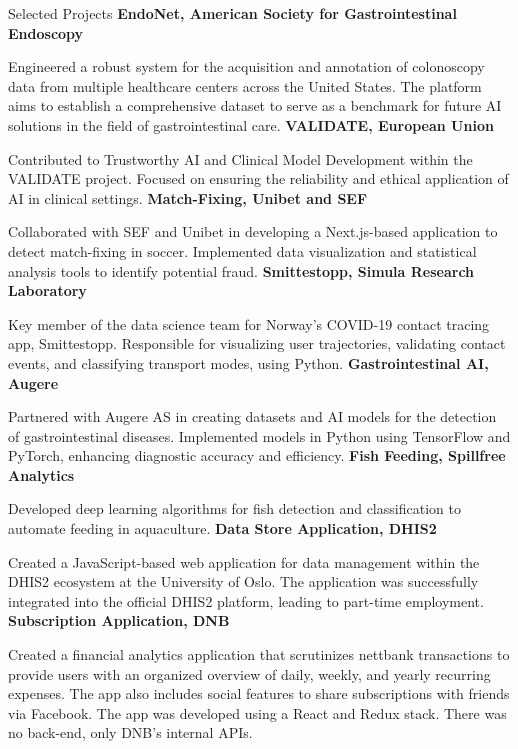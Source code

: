 \documentclass[a4paper,skipsamekey,10pt,english]{curve}
\begin{document}
\begin{rubric}{Selected Projects}
%
\entry*[2023]%
\textbf{EndoNet, American Society for Gastrointestinal Endoscopy} \par
Engineered a robust system for the acquisition and annotation of colonoscopy data from multiple healthcare centers across the United States. The platform aims to establish a comprehensive dataset to serve as a benchmark for future AI solutions in the field of gastrointestinal care.
%
\entry*[2023]%
\textbf{VALIDATE, European Union} \par 
Contributed to Trustworthy AI and Clinical Model Development within the VALIDATE project.
Focused on ensuring the reliability and ethical application of AI in clinical settings.
%
\entry*[2022]%
\textbf{Match-Fixing, Unibet and SEF} \par 
Collaborated with SEF and Unibet in developing a Next.js-based application to detect match-fixing in soccer.
Implemented data visualization and statistical analysis tools to identify potential fraud.
%
\entry*[2020]%
\textbf{Smittestopp, Simula Research Laboratory} \par
Key member of the data science team for Norway's COVID-19 contact tracing app, Smittestopp.
Responsible for visualizing user trajectories, validating contact events, and classifying transport modes, using Python.
%
\entry*[2019]%
\textbf{Gastrointestinal AI, Augere} \par
Partnered with Augere AS in creating datasets and AI models for the detection of gastrointestinal diseases.
Implemented models in Python using TensorFlow and PyTorch, enhancing diagnostic accuracy and efficiency.
%
\entry*[2018]%
\textbf{Fish Feeding, Spillfree Analytics} \par
Developed deep learning algorithms for fish detection and classification to automate feeding in aquaculture.
%
\entry*[2017]%
\textbf{Data Store Application, DHIS2} \par
Created a JavaScript-based web application for data management within the DHIS2 ecosystem at the University of Oslo.
The application was successfully integrated into the official DHIS2 platform, leading to part-time employment.
%
\entry*[2017]%
\textbf{Subscription Application, DNB} \par
Created a financial analytics application that scrutinizes nettbank transactions to provide users with an organized overview of daily, weekly, and yearly recurring expenses. The app also includes social features to share subscriptions with friends via Facebook. The app was developed using a React and Redux stack. There was no back-end, only DNB's internal APIs.
%
\end{rubric}
\end{document}

